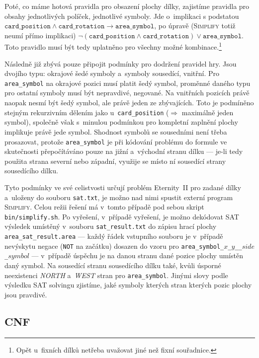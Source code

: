 \documentclass[11pt, titlepage]{report}
\begin{document}
Poté, co máme hotová pravidla pro obsazení plochy dílky, zajistíme pravidla pro obsahy jednotlivých políček, jednotlivé symboly. Jde o~implikaci s podstatou $\texttt{card\_position} \wedge \texttt{card\_rotation} \rightarrow \texttt{area\_symbol}$, po úpravě (\textsc{Simplify} totiž neumí přímo implikaci) $\neg (\texttt{card\_position} \wedge \texttt{card\_rotation}) \vee \texttt{area\_symbol}$. Toto pravidlo musí být tedy uplatněno pro všechny možné kombinace.\footnote{Opět u~fixních dílků netřeba uvažovat jiné než fixní souřadnice.}

Následně již zbývá pouze připojit podmínky pro dodržení pravidel hry. Jsou dvojího typu: okrajové šedé symboly a~symboly sousedící, vnitřní. Pro \texttt{area\_symbol} na okrajové pozici musí platit šedý symbol, proměnné daného typu pro ostatní symboly musí být nepravdivé, negované. Na vnitřních pozicích právě naopak nesmí být šedý symbol, ale právě jeden ze zbývajících. Toto je podmíněno stejným rekurzivním dělením jako u~\texttt{card\_position} ($\Rightarrow$ maximálně jeden symbol), společně však s~minulou podmínkou pro kompletní zaplnění plochy implikuje právě jede symbol. Shodnost symbolů se sousedními není třeba prosazovat, protože \texttt{area\_symbol} je při kódování problému do formule ve skutečnosti přepočítáváno pouze na jižní a~východní stranu dílku --- je-li tedy použita strana severní nebo západní, využije se místo ní sousedící strany sousedícího dílku.

Tyto podmínky ve své celistvosti určují problém Eternity~II pro zadané dílky a~uloženy do souboru \texttt{sat.txt}, je možno nad nimi spustit externí program \textsc{Simplify}. Celou režii řešení má v~tomto případě pod sebou skript \texttt{bin/simplify.sh}. Po vyřešení, v~případě vyřešení, je možno dekódovat SAT výsledek umístěný v~souboru \texttt{sat\_result.txt} do zápisu hrací plochy \texttt{area\_sat\_result.area} --- každý řádek vstupního souboru je v~případě nevýskytu negace (\texttt{NOT} na začátku) dosazen do vzoru pro \texttt{area\_symbol\_$x$\_$y$\_\_$side$\_$symbol$} --- v~případě úspěchu je na danou stranu dané pozice plochy umístěn daný symbol. Na sousedící stranu sousedícího dílku také, kvůli úsporné neexistenci \emph{NORTH} a~\emph{WEST} stran pro \texttt{area\_symbol}. Jinými slovy podle výsledku SAT solvingu zjistíme, jaké symboly kterých stran kterých pozic plochy jsou pravdivé.

\subsection{CNF}
\label{subsec:sat-et-cnf}
\end{document}
